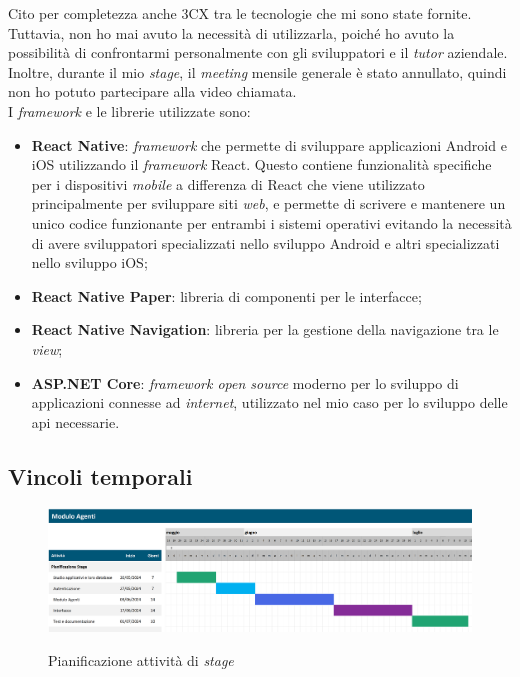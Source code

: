 Cito per completezza anche 3CX tra le tecnologie che mi sono state fornite. Tuttavia, non ho mai avuto la necessità di utilizzarla, 
poiché ho avuto la possibilità di confrontarmi personalmente con gli sviluppatori e il \textit{tutor} aziendale. Inoltre, durante 
il mio \textit{stage}, il 
\textit{meeting} mensile generale è stato annullato, quindi non ho potuto partecipare alla video chiamata.\\
I \textit{framework} e le librerie utilizzate sono:
\begin{itemize}
    \item \textbf{React Native}: \textit{framework} che permette di sviluppare applicazioni Android e iOS utilizzando il 
    \textit{framework} React. Questo contiene funzionalità specifiche per i dispositivi \textit{mobile} a differenza di 
    React che viene utilizzato principalmente per sviluppare siti \textit{web}, e permette di scrivere e mantenere un unico 
    codice funzionante per entrambi i sistemi operativi evitando la necessità di avere sviluppatori specializzati nello 
    sviluppo Android e altri specializzati nello sviluppo iOS;
    \item \textbf{React Native Paper}: libreria di componenti per le interfacce;
    \item \textbf{React Native Navigation}: libreria per la gestione della navigazione tra le \textit{view};
    \item \textbf{ASP.NET Core}: \textit{framework open source} moderno per lo sviluppo di applicazioni connesse ad \textit{internet}, 
          utilizzato nel mio caso per lo sviluppo delle \gls{api} necessarie.
\end{itemize}

\subsection{Vincoli temporali}\label{chap:vincoli temporali}
\begin{figure}[H]
    \centering
    \includegraphics[alt={Pianificazione attività di stage}, width=\textwidth]{img/gantt pianificazione.png}
    \caption[Pianificazione attività di \textit{stage}]
            {Pianificazione attività di \textit{stage}}
    \label{fig:pianificazione stage}
\end{figure}

